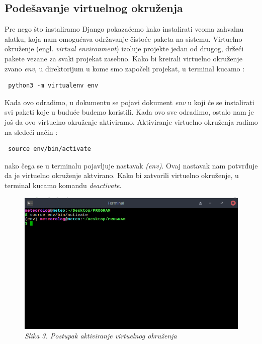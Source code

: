 \documentclass[12pt]{article}
\begin{document}
\subsection{Podešavanje virtuelnog okruženja}
Pre nego što instaliramo Django pokazaćemo kako instalirati veoma zahvalnu alatku, koja nam omogućava održavanje čistoće paketa na sistemu. Virtuelno okruženje (engl. \textsl{virtual environment}) izoluje projekte jedan od drugog, držeći pakete vezane za svaki projekat zasebno. Kako bi kreirali virtuelno okruženje zvano \textsl{env}, u direktorijum u kome smo započeli projekat, u terminal kucamo :
\begin{lstlisting}
 python3 -m virtualenv env
\end{lstlisting} 
Kada ovo odradimo, u dokumentu se pojavi dokument \textsl{env} u koji će se instalirati svi paketi koje u buduće budemo koristili. Kada ovo sve odradimo, ostalo nam je još da ovo virtuelno okruženje aktiviramo. Aktiviranje virtuelno okruženja radimo na sledeći način :
\begin{lstlisting}
 source env/bin/activate
\end{lstlisting} 
nako čega se u terminalu pojavljuje nastavak \textsl{(env)}. Ovaj nastavak nam potvrđuje da je virtuelno okruženje aktvirano. Kako bi zatvorili virtuelno okruženje, u terminal kucamo komandu \textsl{deactivate}. 
\begin{figure}[h!]
\centering
\includegraphics[width=0.8\linewidth]{env.png}
\caption*{\textsl{Slika 3. Postupak aktiviranje virtuelnog okruženja}}
\end{figure}
\end{document}

